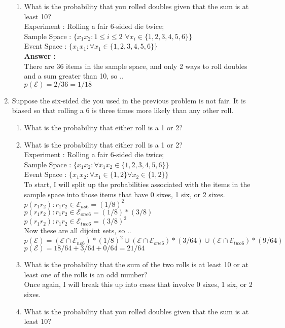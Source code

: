 \documentclass[a4paper,10pt]{article}
\newcommand{\answer}{\textbf{Answer : }}
\newcommand{\E}{\mathcal{E}}
\begin{document}
\begin{enumerate}
\begin{enumerate}
    \item What is the probability that you rolled doubles given that the sum is at least 10? \\
    Experiment   : Rolling a fair 6-sided die twice; \\
    Sample Space : $\{x_1x_2 : 1 \leq i \leq 2$  $\forall x_i \in \{1, 2, 3, 4, 5, 6\} \}$ \\
    Event Space  : $\{x_1x_1 : \forall x_1 \in \{1, 2, 3, 4, 5, 6\} \}$ \\
    \answer \\
    There are 36 items in the sample space, and only 2 ways to roll doubles and a sum greater than 10, so .. \\
    $p(\E) = 2/36 = 1/18$
    \end{enumerate}

\item Suppose the six-sided die you used in the previous problem is not fair. It is biased so that rolling a 6 is three times more likely than any other roll.
    \begin{enumerate}
    \item What is the probability that either roll is a 1 or 2?
    \item What is the probability that either roll is a 1 or 2? \\
    Experiment   : Rolling a fair 6-sided die twice; \\
    Sample Space : $\{x_1x_2 : \forall x_1x_2 \in \{1, 2, 3, 4, 5, 6\} \}$ \\
    Event Space  : $\{x_1x_2 : \forall x_1 \in \{1, 2\} \forall x_2 \in \{1, 2\} \}$ \\
    To start, I will split up the probabilities associated with the items in the sample space into those items that have 0 sixes, 1 six, or 2 sixes. \\
    $p(r_1r_2) : r_1r_2 \in \E_{no6} = (1/8)^2$ \\
    $p(r_1r_2) : r_1r_2 \in \E_{one6} = (1/8)*(3/8)$ \\
    $p(r_1r_2) : r_1r_2 \in \E_{two6} = (3/8)^2$ \\

    Now these are all dijoint sets, so .. \\
    $p(\E) = (\E \cap \E_{no6})*(1/8)^2 \cup (\E \cap \E_{one6})*(3/64) \cup (\E \cap \E_{two6})*(9/64)$ \\
    $ p(\E) = 18/64+3/64+0/64 = 21/64 $

    \item What is the probability that the sum of the two rolls is at least 10 or at least one of the rolls is an odd number? \\
    Once again, I will break this up into cases that involve 0 sixes, 1 six, or 2 sixes.
    \item What is the probability that you rolled doubles given that the sum is at least 10?
    \end{enumerate}


\end{enumerate}
\end{document}
